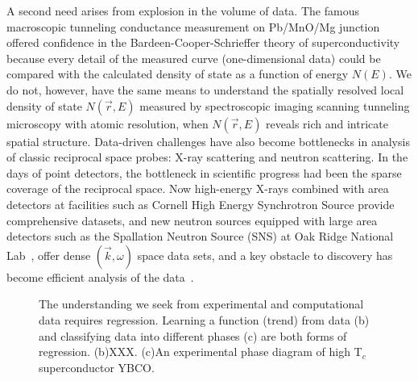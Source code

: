 \documentclass[aps,prb,floatfix,amsmath,amssymb,amsfonts,10pt,floatfix,longbibliography]{revtex4-1}
\begin{document}
A second need arises from explosion in the volume of data. 
The famous macroscopic tunneling conductance measurement on Pb/MnO/Mg junction\cite{Giaever1962} offered confidence in the Bardeen-Cooper-Schrieffer theory of superconductivity because every detail of the measured curve (one-dimensional data) could be compared with the calculated density of state as a function of energy $N(E)$.
We do not, however, have the same means to understand the spatially resolved local density of state $N(\vec{r},E)$ measured by spectroscopic imaging scanning tunneling microscopy with atomic resolution, when $N(\vec{r},E)$ reveals rich and intricate spatial structure. Data-driven challenges have also become bottlenecks in analysis of classic reciprocal space probes: X-ray scattering and neutron scattering. 
In the days of point detectors, the bottleneck in scientific progress had been the sparse coverage of the reciprocal space. Now high-energy X-rays combined with area detectors at facilities such as Cornell High Energy Synchrotron Source provide comprehensive datasets, and new neutron sources equipped with large area detectors such as the Spallation Neutron Source (SNS) at Oak Ridge National Lab~\cite{SNS}, offer dense $(\vec{k},\omega)$ space data sets, and a key obstacle to discovery has become efficient analysis of the data~\cite{Miller2009,Stone2014-SNS}. 



\begin{figure}[h]
\centering
{}
\quad
{}
\caption{\label{fig:learning}
The understanding we seek from experimental and computational data requires regression. Learning a function (trend) from data (b) and classifying data into different phases (c) are both forms of regression. (b)XXX. (c)An experimental phase diagram of high T$_c$ superconductor YBCO.\cite{Sato2017}}
\end{figure}
\end{document}
